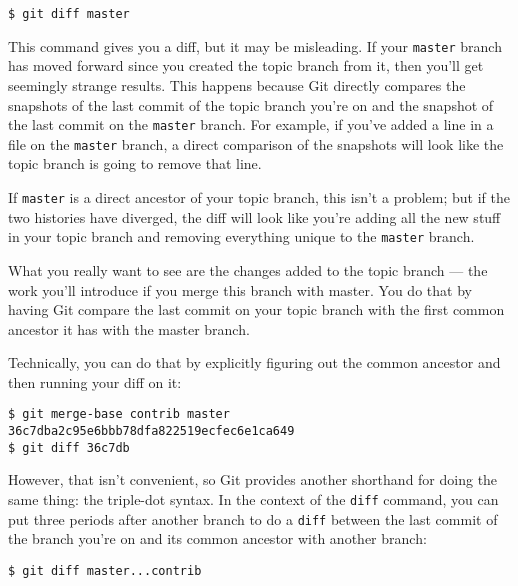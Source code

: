 \documentclass[a4paper]{book}
\begin{document}
\begin{shaded}\begin{verbatim}
$ git diff master
\end{verbatim}\end{shaded}

This command gives you a diff, but it may be misleading. If your \texttt{master} branch has moved forward since you created the topic branch from it, then you'll get seemingly strange results. This happens because Git directly compares the snapshots of the last commit of the topic branch you're on and the snapshot of the last commit on the \texttt{master} branch. For example, if you've added a line in a file on the \texttt{master} branch, a direct comparison of the snapshots will look like the topic branch is going to remove that line.

If \texttt{master} is a direct ancestor of your topic branch, this isn't a problem; but if the two histories have diverged, the diff will look like you're adding all the new stuff in your topic branch and removing everything unique to the \texttt{master} branch.

What you really want to see are the changes added to the topic branch --- the work you'll introduce if you merge this branch with master. You do that by having Git compare the last commit on your topic branch with the first common ancestor it has with the master branch.

Technically, you can do that by explicitly figuring out the common ancestor and then running your diff on it:

\begin{shaded}\begin{verbatim}
$ git merge-base contrib master
36c7dba2c95e6bbb78dfa822519ecfec6e1ca649
$ git diff 36c7db
\end{verbatim}\end{shaded}

However, that isn't convenient, so Git provides another shorthand for doing the same thing: the triple-dot syntax. In the context of the \texttt{diff} command, you can put three periods after another branch to do a \texttt{diff} between the last commit of the branch you're on and its common ancestor with another branch:

\begin{shaded}\begin{verbatim}
$ git diff master...contrib
\end{verbatim}\end{shaded}
\end{document}

